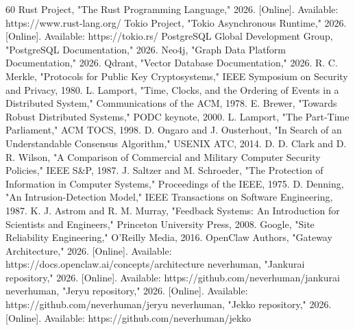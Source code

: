 \documentclass[10pt,journal,onecolumn]{IEEEtran}
\begin{document}
\begin{thebibliography}{60}
 Rust Project, "The Rust Programming Language," 2026. [Online]. Available: https://www.rust-lang.org/
 Tokio Project, "Tokio Asynchronous Runtime," 2026. [Online]. Available: https://tokio.rs/
 PostgreSQL Global Development Group, "PostgreSQL Documentation," 2026.
 Neo4j, "Graph Data Platform Documentation," 2026.
 Qdrant, "Vector Database Documentation," 2026.
 R. C. Merkle, "Protocols for Public Key Cryptosystems," IEEE Symposium on Security and Privacy, 1980.
 L. Lamport, "Time, Clocks, and the Ordering of Events in a Distributed System," Communications of the ACM, 1978.
 E. Brewer, "Towards Robust Distributed Systems," PODC keynote, 2000.
 L. Lamport, "The Part-Time Parliament," ACM TOCS, 1998.
 D. Ongaro and J. Ousterhout, "In Search of an Understandable Consensus Algorithm," USENIX ATC, 2014.
 D. D. Clark and D. R. Wilson, "A Comparison of Commercial and Military Computer Security Policies," IEEE S\&P, 1987.
 J. Saltzer and M. Schroeder, "The Protection of Information in Computer Systems," Proceedings of the IEEE, 1975.
 D. Denning, "An Intrusion-Detection Model," IEEE Transactions on Software Engineering, 1987.
 K. J. Astrom and R. M. Murray, "Feedback Systems: An Introduction for Scientists and Engineers," Princeton University Press, 2008.
 Google, "Site Reliability Engineering," O'Reilly Media, 2016.
 OpenClaw Authors, "Gateway Architecture," 2026. [Online]. Available: https://docs.openclaw.ai/concepts/architecture
 neverhuman, "Jankurai repository," 2026. [Online]. Available: https://github.com/neverhuman/jankurai
 neverhuman, "Jeryu repository," 2026. [Online]. Available: https://github.com/neverhuman/jeryu
 neverhuman, "Jekko repository," 2026. [Online]. Available: https://github.com/neverhuman/jekko
\end{thebibliography}
\end{document}
